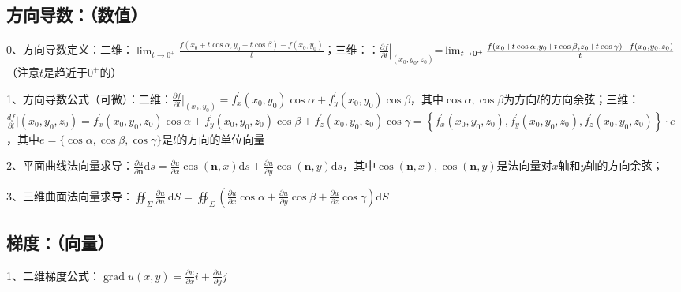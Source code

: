\subsection{方向导数：（数值）}

0、方向导数定义：二维：$\lim _{t \rightarrow 0^{+}} \frac{f\left(x_{0}+t \cos \alpha, y_{0}+t \cos \beta\right)-f\left(x_{0}, y_{0}\right)}{t}$；三维：：$\left.\frac{\partial f}{\partial l}\right|_{\left(x_{0}, y_{0}, z_{0}\right)}$=$\newline\lim _{t \rightarrow 0^{+}} \frac{f\left(x_{0}+t \cos \alpha, y_{0}+t \cos \beta, z_{0}+t \cos \gamma\right)-f\left(x_{0}, y_{0}, z_{0}\right)}{t}$（注意$t$是趋近于$0^+$的）

1、方向导数公式（可微）：二维：$\frac{\partial f}{\partial l}|_{\left(x_{0}, y_{0}\right)}= f_{x}^{\prime}(x_{0},y_{0}) \cos \alpha+f_{y}^{\prime}\left(x_{0}, y_{0}\right) \cos \beta$，其中$\cos \alpha, \cos \beta$为方向$l$的方向余弦；三维：$\frac{d f}{\partial l}|{\left(x_{0}, y_{0}, z_{0}\right)} =f_{x}^{\prime}\left(x_{0}, y_{0}, z_{0}\right) \cos \alpha+f_{y}^{\prime}\left(x_{0}, y_{0}, z_{0}\right) \cos \beta+f_{z}^{\prime}\left(x_{0}, y_{0}, z_{0}\right) \cos \gamma =\left\{f_{x}^{\prime}\left(x_{0}, y_{0}, z_{0}\right), f_{y}^{\prime}\left(x_{0}, y_{0}, z_{0}\right), f_{z}^{\prime}\left(x_{0}, y_{0}, z_{0}\right)\right\} \cdot e$，其中$e=\{\cos \alpha, \cos \beta, \cos \gamma\}$是$l$的方向的单位向量

2、平面曲线法向量求导：$\frac{\partial u}{\partial \boldsymbol{n}} \mathrm{d} s=\frac{\partial u}{\partial x} \cos (\boldsymbol{n}, x) \mathrm{d} s+\frac{\partial u}{\partial y} \cos (\boldsymbol{n}, y) \mathrm{d} s$，其中$\cos (\boldsymbol{n}, x) ,\cos (\boldsymbol{n}, y)$是法向量对$x$轴和$y$轴的方向余弦；

3、三维曲面法向量求导：$\oiint_{\Sigma} \frac{\partial u}{\partial n} \mathrm{~d} S=\oiint_{\Sigma}\left(\frac{\partial u}{\partial x} \cos \alpha+\frac{\partial u}{\partial y} \cos \beta+\frac{\partial u}{\partial z} \cos \gamma\right) \mathrm{d} S$



\subsection{梯度：（向量）}

1、二维梯度公式：$\operatorname{grad} u(x, y)=\frac{\partial u}{\partial x} i+\frac{\partial u}{\partial y} j$

